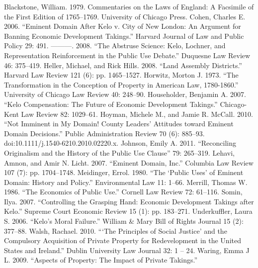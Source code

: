 Blackstone, William. 1979. Commentaries on the Laws of England: A Facsimile of the First Edition of 1765--1769. University of Chicago Press.
Cohen, Charles E. 2006. “Eminent Domain After Kelo v. City of New London: An Argument for Banning Economic Development Takings.” Harvard Journal of Law and Public Policy 29: 491.
———. 2008. “The Abstruse Science: Kelo, Lochner, and Representation Reinforcement in the Public Use Debate.” Duquesne Law Review 46: 375–419.
Heller, Michael, and Rick Hills. 2008. “Land Assembly Districts.” Harvard Law Review 121 (6): pp. 1465–1527.
Horwitz, Morton J. 1973. “The Transformation in the Conception of Property in American Law, 1780-1860.” University of Chicago Law Review 40: 248–90.
Householder, Benjamin A. 2007. “Kelo Compensation: The Future of Economic Development Takings.” Chicago-Kent Law Review 82: 1029–61.
Hoyman, Michele M., and Jamie R. McCall. 2010. “Not Imminent in My Domain! County Leaders’ Attitudes toward Eminent Domain Decisions.” Public Administration Review 70 (6): 885–93. doi:10.1111/j.1540-6210.2010.02220.x.
Johnson, Emily A. 2011. “Reconciling Originalism and the History of the Public Use Clause” 79: 265–319.
Lehavi, Amnon, and Amir N. Licht. 2007. “Eminent Domain, Inc.” Columbia Law Review 107 (7): pp. 1704–1748.
Meidinger, Errol. 1980. “The ‘Public Uses’ of Eminent Domain: History and Policy.” Environmental Law 11: 1–66.
Merrill, Thomas W. 1986. “The Economics of Public Use.” Cornell Law Review 72: 61–116.
Somin, Ilya. 2007. “Controlling the Grasping Hand: Economic Development Takings after Kelo.” Supreme Court Economic Review 15 (1): pp. 183–271.
Underkuffler, Laura S. 2006. “Kelo’s Moral Failure.” William \& Mary Bill of Rights Journal 15 (2): 377–88.
Walsh, Rachael. 2010. “‘The Principles of Social Justice’ and the Compulsory Acquisition of Private Property for Redevelopment in the United States and Ireland.” Dublin University Law Journal 32: 1 – 24.
Waring, Emma J L. 2009. “Aspects of Property: The Impact of Private Takings.”
 


